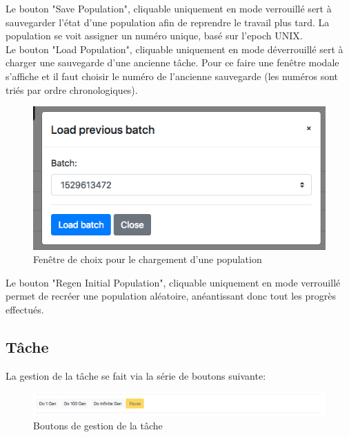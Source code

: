 \documentclass{article}
\begin{document}
Le bouton "Save Population", cliquable uniquement en mode verrouillé sert à sauvegarder l'état d'une population afin de reprendre le travail plus tard. La population se voit assigner un numéro unique, basé sur l'epoch UNIX.\\

Le bouton "Load Population", cliquable uniquement en mode déverrouillé sert à charger une sauvegarde d'une ancienne tâche. Pour ce faire une fenêtre modale s'affiche et il faut choisir le numéro de l'ancienne sauvegarde (les numéros sont triés par ordre chronologiques).\\

\begin{figure}[H]
\begin{center}
	\includegraphics[scale=0.4]{loadpop.png} 
	\caption{Fenêtre de choix pour le chargement d'une population}
\end{center}
\end{figure}

Le bouton "Regen Initial Population", cliquable uniquement en mode verrouillé permet de recréer une population aléatoire, anéantissant donc tout les progrès effectués. 

\subsection{Tâche}

La gestion de la tâche se fait via la série de boutons suivante:
\begin{figure}[H]
\begin{center}
	\includegraphics[scale=0.4]{taskmgr.png} 
	\caption{Boutons de gestion de la tâche}
\end{center}
\end{figure}
\end{document}
